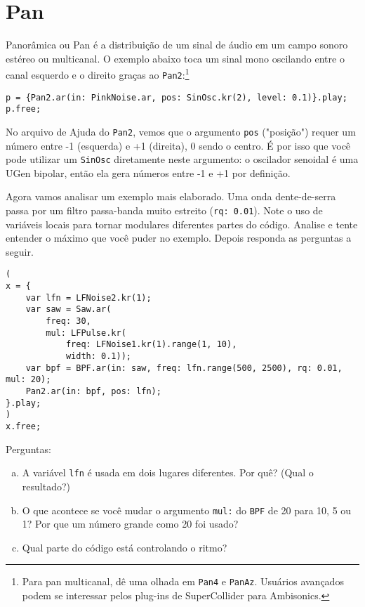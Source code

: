 \section{Pan}

Panorâmica ou Pan é a distribuição de um sinal de áudio em um campo sonoro estéreo ou multicanal. O exemplo abaixo toca um sinal mono oscilando entre o canal esquerdo e o direito graças ao \texttt{Pan2}:\footnote{Para pan multicanal, dê uma olhada em \texttt{Pan4} e \texttt{PanAz}. Usuários avançados podem se interessar pelos plug-ins de SuperCollider para Ambisonics.}
\begin{lstlisting}[style=SuperCollider-IDE, basicstyle=\scttfamily\footnotesize]
p = {Pan2.ar(in: PinkNoise.ar, pos: SinOsc.kr(2), level: 0.1)}.play;
p.free;
\end{lstlisting}
No arquivo de Ajuda do \texttt{Pan2}, vemos que o argumento \texttt{pos} ("posição") requer um número entre -1 (esquerda) e +1 (direita), 0 sendo o centro. É por isso que você pode utilizar um \texttt{SinOsc} diretamente neste argumento: o oscilador senoidal é uma UGen bipolar, então ela gera números entre -1 e +1 por definição.

Agora vamos analisar um exemplo mais elaborado. Uma onda dente-de-serra passa por um filtro passa-banda muito estreito (\texttt{rq: 0.01}). Note o uso de variáveis locais para tornar modulares diferentes partes do código. Analise e tente entender o máximo que você puder no exemplo. Depois responda as perguntas a seguir.

\begin{lstlisting}[style=SuperCollider-IDE, basicstyle=\scttfamily\footnotesize]
(
x = {
	var lfn = LFNoise2.kr(1);
	var saw = Saw.ar(
		freq: 30, 
		mul: LFPulse.kr(
			freq: LFNoise1.kr(1).range(1, 10),
			width: 0.1));
	var bpf = BPF.ar(in: saw, freq: lfn.range(500, 2500), rq: 0.01, mul: 20);
	Pan2.ar(in: bpf, pos: lfn);
}.play;
)
x.free;
\end{lstlisting}
 
Perguntas:
\begin{enumerate}[(a)]
\item A variável \texttt{lfn} é usada em dois lugares diferentes. Por quê? (Qual o resultado?)
\item O que acontece se você mudar o argumento \texttt{mul:} do \texttt{BPF} de 20 para 10, 5 ou 1? Por que um número grande como 20 foi usado?
\item Qual parte do código está controlando o ritmo?
\end{enumerate}

